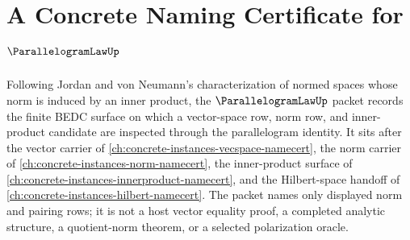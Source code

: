 \chapter{A Concrete Naming Certificate for $\ParallelogramLawUp$}
\label{ch:concrete-instances-parallelogram-law-namecert}

Following Jordan and von Neumann's characterization of normed spaces whose norm is induced by an inner product, the $\ParallelogramLawUp$ packet records the finite BEDC surface on which a vector-space row, norm row, and inner-product candidate are inspected through the parallelogram identity. It sits after the vector carrier of \autoref{ch:concrete-instances-vecspace-namecert}, the norm carrier of \autoref{ch:concrete-instances-norm-namecert}, the inner-product surface of \autoref{ch:concrete-instances-innerproduct-namecert}, and the Hilbert-space handoff of \autoref{ch:concrete-instances-hilbert-namecert}. The packet names only displayed norm and pairing rows; it is not a host vector equality proof, a completed analytic structure, a quotient-norm theorem, or a selected polarization oracle.


